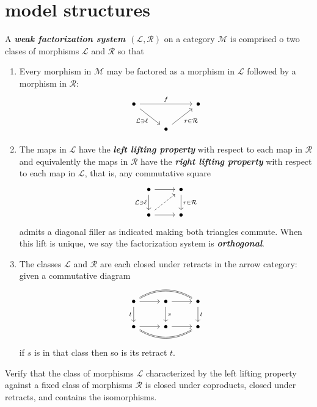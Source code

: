 \documentclass{article}
\newcommand{\Lc}{\mathcal{L}}
\newcommand{\Mc}{\mathcal{M}}
\newcommand{\Rc}{\mathcal{R}}
\begin{document}
\section{model structures}
\begin{defn}
	A \textbf{\textit{weak factorization system $(\Lc,\Rc)$}} on a category $\Mc$ is comprised o two clases of morphisms $\Lc$ and $\Rc$ so that
	\begin{enumerate}
		\item Every morphism in $\Mc$ may be factored as a morphism in $\Lc$ followed by a morphism in $\Rc$:
		\[\begin{tikzcd}
			\bullet\arrow[rr,"f"]\arrow[rd,"\Lc\ni\ell",swap]&&\bullet\\
			&\bullet\arrow[ru,"r\in\Rc",swap]
		\end{tikzcd}\]
		\item The maps in $\Lc$ have the \textbf{\textit{left lifting property}} with respect to each map in $\Rc$ and equivalently the maps in $\Rc$ have the \textbf{\textit{right lifting property}} with respect to each map in $\Lc$, that is, any commutative square
		\[\begin{tikzcd}
			\bullet\arrow[d,"\Lc\ni\ell",swap]\arrow[r]&\bullet\arrow[d,"r\in\Rc"]\\
			\bullet\arrow[ur,dashed]\arrow[r]&\bullet
		\end{tikzcd}\]
		admits a diagonal filler as indicated making both triangles commute. When this lift is unique, we say the factorization system is \textbf{\textit{orthogonal}}.
		\item The classes $\Lc$ and $\Rc$ are each closed under retracts in the arrow category: given a commutative diagram
		\[\begin{tikzcd}
			\bullet\arrow[r]\arrow[d,"t",swap]\arrow[rr,bend left,no head,shift left=.3]\arrow[rr,bend left,no head,shift right=.3]&\bullet\arrow[r]\arrow[d,"s"]&\bullet\arrow[d,"t"]\\
			\bullet\arrow[r]\arrow[rr,bend right,no head, shift right=.3]\arrow[rr,bend right,no head, shift left=.3]&\bullet\arrow[r]&\bullet
		\end{tikzcd}\]
		if $s$ is in that class then so is its retract $t$.
	\end{enumerate}
\end{defn}

\begin{exercise}
Verify that the class of morphisms $\Lc$ characterized by the left lifting property against a fixed class of morphisms $\Rc$ is closed under coproducts, closed under retracts, and contains the isomorphisms.
\end{exercise}
\end{document}
